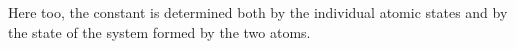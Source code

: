 Here too, the constant is determined both by the individual atomic states and by the state of the system formed by the two atoms.
